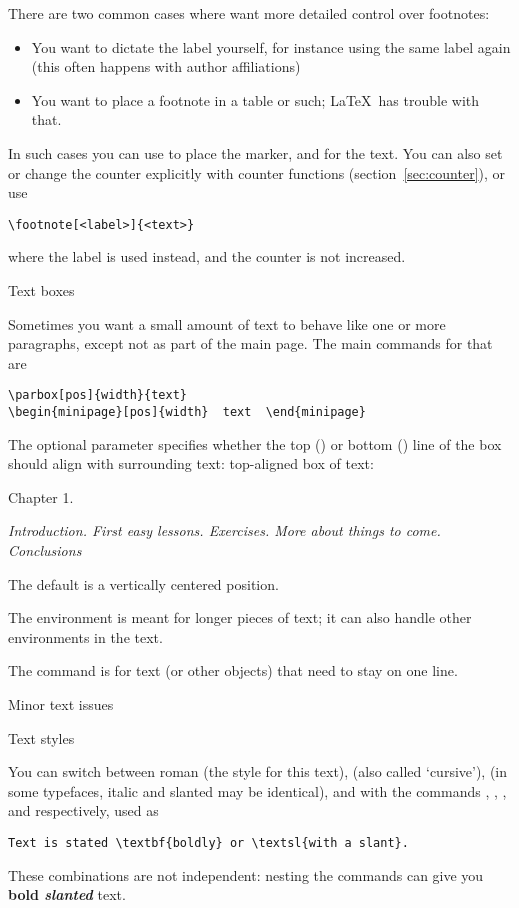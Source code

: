 There are two common cases where want more detailed control over
footnotes:
\begin{itemize}
\item You want to dictate the label yourself, for instance using the
  same label again (this often happens with author affiliations)
\item You want to place a footnote in a table or such; \LaTeX\ has
  trouble with that.
\end{itemize}
In such cases you can use  to place
the marker, and  for the text. You can also
set or change the  counter explicitly with counter functions
(section~\ref{sec:counter}), or use
\begin{verbatim}
\footnote[<label>]{<text>}
\end{verbatim}
where the label is used instead, and the counter is not increased.

 {Text boxes}
\label{sec:textbox}

Sometimes you want a small amount of text to behave like one or more
paragraphs, except not as part of the main page. The main commands for
that are 
\begin{verbatim}
\parbox[pos]{width}{text}
\begin{minipage}[pos]{width}  text  \end{minipage}
\end{verbatim}
The optional  parameter specifies whether the top () or
bottom () line of the box should align with surrounding text:
top-aligned box of text:
\begin{examplewithcode}
Chapter 1. \parbox[t]{2in}{\slshape Introduction. First easy
  lessons. Exercises. More about things to come. Conclusions}
\end{examplewithcode}
The default is a vertically centered position.

The  environment is meant for longer pieces of text; it
can also handle other environments in the text.

The  command is for text (or other objects) that need to
stay on one line.

 {Minor text issues}

 {Text styles}

You can switch between roman (the style
for this text),  (also
called `cursive'),
 (in some typefaces,
italic and slanted may be identical), and
 with the commands
,
, , and  respectively,
used as 
\begin{verbatim}
Text is stated \textbf{boldly} or \textsl{with a slant}.
\end{verbatim}
These combinations are not independent: nesting the commands can give
you \textbf{bold \textsl{slanted}} text.

